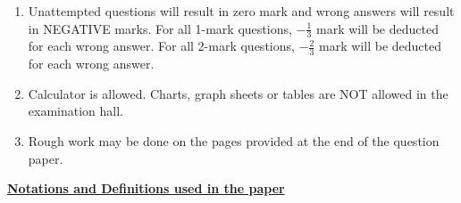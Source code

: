 \documentclass[11pt]{article}
\begin{document}
\begin{enumerate}[label=\arabic*.]
    \item Unattempted questions will result in zero mark and wrong answers will result in NEGATIVE marks. For all 1-mark questions, \textbf{\(-\frac{1}{3}\)} mark will be deducted for each wrong answer. For all 2-mark questions, \textbf{\(-\frac{2}{3}\)} mark will be deducted for each wrong answer.

    \item Calculator is allowed. Charts, graph sheets or tables are NOT allowed in the examination hall.

    \item Rough work may be done on the pages provided at the end of the question paper.
\end{enumerate}



\newpage 

\begin{center}
    \textbf{\underline{Notations and Definitions used in the paper}}
\end{center}

\vspace{0.3cm}
\end{document}
